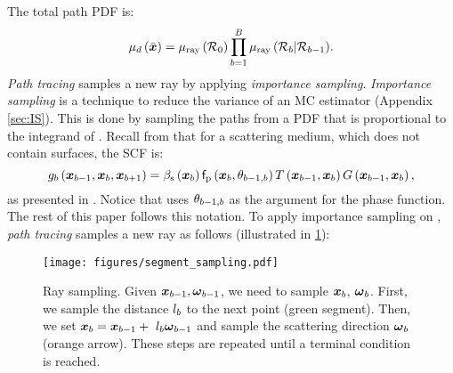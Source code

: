 \documentclass{article}
\begin{document}
The total path \ac{PDF} is:
\begin{equation}
\label{eq:path_sampling}
\mu_{d}\left({\Bar{\boldsymbol{x}}}\right) =\mu_{\text{ray}}\left({\mathcal{R}_0}\right)\prod_{b=1}^{B}{\mu_{\text{ray}}\left({\mathcal{R}_{b}|\mathcal{R}_{b-1}}\right)}.
\end{equation}
{\em Path tracing} samples a new ray by applying {\em importance sampling}. {\em Importance sampling} \citep{kajiya1986rendering, veach1997robust} is a technique to reduce the variance of an \ac{MC} estimator (Appendix \ref{sec:IS}). This is done by sampling the paths from a \ac{PDF} that is proportional to the integrand of \eq{\ref{eq:path_integral_formulation}}. Recall from \eq{\ref{eq:gk}-\ref{eq:cont_func}} that for a scattering medium, which does not contain surfaces, the \ac{SCF} is:
\begin{equation}
\label{eq:gk_scatter}
g_{b}\left({\boldsymbol{x}_{b-1}, \boldsymbol{x}_{b}, \boldsymbol{x}_{b+1}}\right)=\beta_{\text{s}}\left({\boldsymbol{x}_{b}}\right)\mathsf{f}_{\text{p}}\left({\boldsymbol{x}_{b},\theta_{b-1,b}}\right)
T\left({{\boldsymbol{x}_{b-1}},{\boldsymbol{x}_{b}}}\right) G\left({\boldsymbol{x}_{b-1},\boldsymbol{x}_{b}}\right) ,
\end{equation}
as presented in \eq{\ref{eq:gk}}. Notice that \eq{\ref{eq:gk_scatter}} uses $\theta_{b-1,b}$ as the argument for the phase function. The rest of this paper follows this notation. To apply importance sampling on \eq{\ref{eq:path_integral_formulation}}, {\em path tracing} samples a new ray as follows (illustrated in \fig\ref{fig:segment_sampling}):
\begin{figure}[t]
  \centering
  \texttt{[image: figures/segment\_sampling.pdf]} 
    \caption{Ray sampling. Given $\boldsymbol{x}_{b-1}, \boldsymbol{\omega}_{b-1}$, we need to sample $\boldsymbol{x}_{b}$, $\boldsymbol{\omega}_{b}$. First, we sample the distance $l_{b}$ to the next point (green segment). Then, we set $\boldsymbol{x}_{b}=\boldsymbol{x}_{b-1}+~l_{b}\boldsymbol{\omega}_{b-1}$ and sample the scattering direction $\boldsymbol{\omega}_{b}$ (orange arrow). These steps are repeated until a terminal condition is reached.}
    \label{fig:segment_sampling}
\end{figure}    
\end{document}
